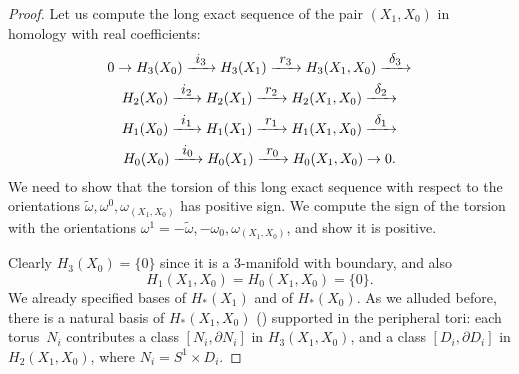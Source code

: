 \documentclass[JEP,XML,SOM,Unicode,NoFloatCountersInSection,published]{cedram}
\newcommand\To[1]{\mathchoice{\xrightarrow{\textstyle\kern4pt#1\kern3pt}}{\stackrel{#1}{\longrightarrow}}{}{}}
\theoremstyle{plain}
\theoremstyle{definition}
\theoremstyle{remark}
\numberwithin{equation}{section}
\begin{document}
\begin{proof}
Let us compute the long exact sequence of the pair $(X_1,X_0)$ in homology with real coefficients:
\begin{multline}
\label{eq:LES}
0 \to H_3(X_0) \To{i_3} H_3(X_1) \To{r_3} H_3(X_1, X_0) \To{\delta_3} \\
H_2(X_0) \To{i_2} H_2(X_1) \To{r_2} H_2(X_1, X_0) \To{\delta_2}\\
H_1(X_0) \To{i_1} H_1(X_1) \To{r_1} H_1(X_1, X_0) \To{\delta_1}\\
H_0(X_0) \To{i_0} H_0(X_1) \To{r_0} H_0(X_1, X_0) \to 0.
\end{multline}
We need to show that the torsion of this long exact sequence with respect to the orientations $\widetilde \omega, \omega^0, \omega_{(X_1,X_0)}$ has positive sign. We compute the sign of the torsion with the orientations $\omega^1 = -\widetilde \omega, -\omega_0, \omega_{(X_1,X_0)}$, and show it is positive.

Clearly $H_3(X_0) = \{0 \}$ since it is a 3\nobreakdash-manifold with boundary, and also
\[
H_1(X_1, X_0) = H_0(X_1, X_0) = \{0\}.
\]
We already specified bases of $H_*(X_1)$ and of $H_*(X_0)$. As we alluded before, there is a natural basis of $H_*(X_1, X_0)$ (\cite[V.2.2]{Turaev_tors}) supported in the peripheral tori: each torus~$N_i$ contributes a class $[N_i, \partial N_i]$ in $H_3(X_1, X_0)$, and a class $[D_i, \partial D_i]$ in $H_2(X_1, X_0)$, where $N_i = S^1 \times D_i$.


\end{proof}
\end{document}
